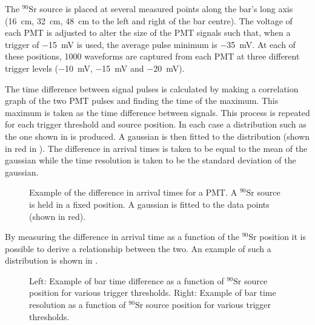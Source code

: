 The $^{90}\text{Sr}$ source is placed at several measured points along the bar's long axis (\SI{16}{\cm}, \SI{32}{\cm}, \SI{48}{\cm} to the left and right of the bar centre).
The voltage of each PMT is adjusted to alter the size of the PMT signals such that, when a trigger of \SI{-15}{\milli\volt} is used, the average pulse minimum is \SI{-35}{\milli\volt}.
At each of these positions, 1000 waveforms are captured from each PMT at three different trigger levels (\SI{-10}{\milli\volt}, \SI{-15}{\milli\volt} and \SI{-20}{\milli\volt}).

The time difference between signal pulses is calculated by making a correlation graph of the two PMT pulses and finding the time of the maximum.
This maximum is taken as the time difference between signals.
This process is repeated for each trigger threshold and source position.
In each case a distribution such as the one shown in  is produced.
A gaussian is then fitted to the distribution (shown in red in ).
The difference in arrival times is taken to be equal to the mean of the gaussian while the time resolution is taken to be the standard deviation of the gaussian.

\begin{figure}[h]
  \begin{adjustbox}{max totalsize={.8\textwidth}, center}
    
  \end{adjustbox}
  \caption[Example of difference in signal arrival times for a PMT]{Example of the difference in arrival times for a PMT. A $^{90}\text{Sr}$ source is held in a fixed position. A gaussian is fitted to the data points (shown in red).}
  \label{fig:deltaTEx}
\end{figure}

By measuring the difference in arrival time as a function of the $^{90}\text{Sr}$ position it is possible to derive a relationship between the two.
An example of such a distribution is shown in .

\begin{figure}[h]
  \begin{minipage}[t]{.5\textwidth}
    \begin{adjustbox}{max totalsize={\textwidth}, center}
      
    \end{adjustbox}
  \end{minipage}
  \hfill
  \begin{minipage}[t]{.5\textwidth}
    \begin{adjustbox}{max totalsize={\textwidth}, center}
      
    \end{adjustbox}
  \end{minipage}
  \caption[Examples of bar time difference and time resolution as a function of source position]{Left: Example of bar time difference as a function of $^{90}\text{Sr}$ source position for various trigger thresholds. Right: Example of bar time resolution as a function of $^{90}\text{Sr}$ source position for various trigger thresholds. }
  \label{fig:barTimeDiffRes}
\end{figure}

